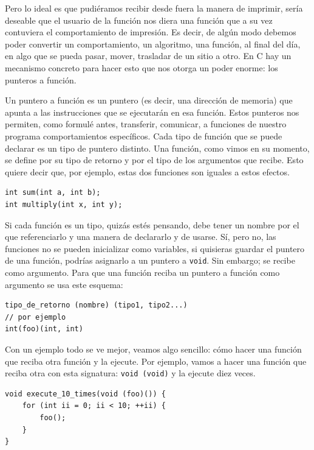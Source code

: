 \documentclass[a4paper]{article}
\begin{document}
Pero lo ideal es que pudiéramos recibir desde fuera la manera de imprimir, sería
deseable que el usuario de la función nos diera una función que a su vez
contuviera el comportamiento de impresión. Es decir, de algún modo debemos
poder convertir un comportamiento, un algoritmo, una función, al final del día,
en algo que se pueda pasar, mover, trasladar de un sitio a otro. En C hay un
mecanismo concreto para hacer esto que nos otorga un poder enorme:
los punteros a función.

Un puntero a función es un puntero (es decir, una dirección de memoria) que
apunta a las instrucciones que se ejecutarán en esa función. Estos punteros nos
permiten, como formulé antes, transferir, comunicar, a funciones de nuestro
programa comportamientos específicos. Cada tipo de función que se puede
declarar es un tipo de puntero distinto. Una función, como vimos en su momento,
se define por su tipo de retorno y por el tipo de los argumentos que recibe.
Esto quiere decir que, por ejemplo, estas dos funciones son iguales a estos
efectos.

\noindent
\begin{minipage}[H]{\linewidth}
\begin{lstlisting}[style=C]
int sum(int a, int b);
int multiply(int x, int y);
\end{lstlisting}
\end{minipage}

Si cada función es un tipo, quizás estés pensando, debe tener un nombre por
el que referenciarlo y una manera de declararlo y de usarse. Sí, pero no, las
funciones no se pueden inicializar como variables, si quisieras guardar el
puntero de una función, podrías asignarlo a un puntero a \verb!void!.
Sin embargo; se recibe como argumento. Para que una función reciba un puntero
a función como argumento se usa este esquema:

\noindent
\begin{minipage}[H]{\linewidth}
\begin{lstlisting}[style=C]
tipo_de_retorno (nombre) (tipo1, tipo2...)
// por ejemplo
int(foo)(int, int)
\end{lstlisting}
\end{minipage}

Con un ejemplo todo se ve mejor, veamos algo sencillo: cómo hacer una función
que reciba otra función y la ejecute. Por ejemplo, vamos a hacer una función
que reciba otra con esta signatura: \lstinline[style=C]!void (void)! y la ejecute
diez veces.

\noindent
\begin{minipage}[H]{\linewidth}
\begin{lstlisting}[style=C, label={lst:argumentFoo},
caption={Ejemplo primero de puntero a función como argumento}]
void execute_10_times(void (foo)()) {
    for (int ii = 0; ii < 10; ++ii) {
        foo();
    }
}
\end{lstlisting}
\end{minipage}
\end{document}
